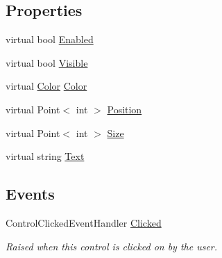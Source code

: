 \subsection*{Properties}
\begin{DoxyCompactItemize}
\item 
virtual bool \hyperlink{class_tri_devs_1_1_tri_engine2_d_1_1_u_i_1_1_control_a662c990a4fec19ac7c6c1a1a01648c77}{Enabled}
\item 
virtual bool \hyperlink{class_tri_devs_1_1_tri_engine2_d_1_1_u_i_1_1_control_acecae44ceb3fa79d765f8f49b29fbaa8}{Visible}
\item 
virtual \hyperlink{struct_tri_devs_1_1_tri_engine2_d_1_1_u_i_1_1_color}{Color} \hyperlink{class_tri_devs_1_1_tri_engine2_d_1_1_u_i_1_1_control_a0fd69d349a7ef225ac6273c0a206356a}{Color}
\item 
virtual Point$<$ int $>$ \hyperlink{class_tri_devs_1_1_tri_engine2_d_1_1_u_i_1_1_control_af0c36c7173572c359c6e3b7a79346c65}{Position}
\item 
virtual Point$<$ int $>$ \hyperlink{class_tri_devs_1_1_tri_engine2_d_1_1_u_i_1_1_control_a9f162a69e4a170ed284cf13b0eaa655f}{Size}
\item 
virtual string \hyperlink{class_tri_devs_1_1_tri_engine2_d_1_1_u_i_1_1_control_aa7bf638cc2b14351c9b09c5a7fdefce9}{Text}
\end{DoxyCompactItemize}
\subsection*{Events}
\begin{DoxyCompactItemize}
\item 
Control\-Clicked\-Event\-Handler \hyperlink{class_tri_devs_1_1_tri_engine2_d_1_1_u_i_1_1_control_aa1540c7b2b3439e037b4e6c0247086fc}{Clicked}
\begin{DoxyCompactList}\small\item\em Raised when this control is clicked on by the user. \end{DoxyCompactList}\end{DoxyCompactItemize}


